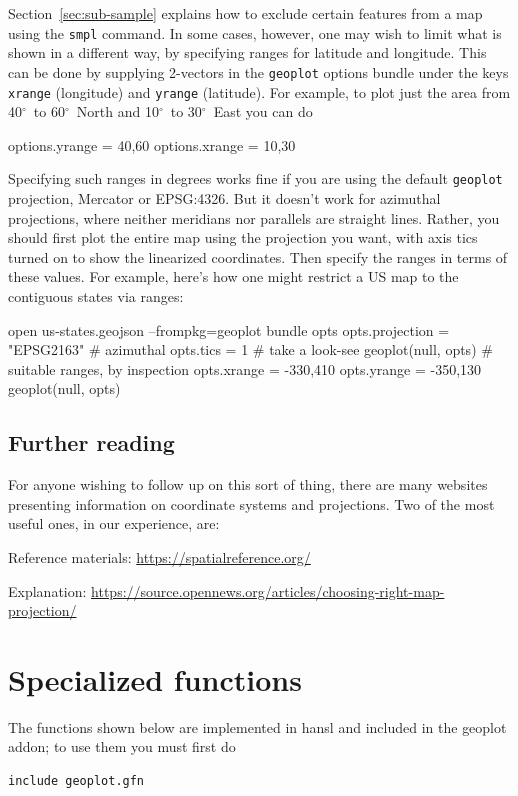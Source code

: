 \documentclass{article}
\renewcommand{\deg}{$^{\circ}$}
\newcommand{\myappendix}[1]{%
\addtocounter{appcount}{1}
\section{#1}}
\begin{document}
Section~\ref{sec:sub-sample} explains how to exclude certain features
from a map using the \texttt{smpl} command. In some cases, however,
one may wish to limit what is shown in a different way, by specifying
ranges for latitude and longitude. This can be done by supplying
2-vectors in the \texttt{geoplot} options bundle under the keys
\texttt{xrange} (longitude) and \texttt{yrange} (latitude). For
example, to plot just the area from 40\deg\ to 60\deg\ North and
10\deg\ to 30\deg\ East you can do
\begin{code}
options.yrange = {40,60}
options.xrange = {10,30}
\end{code}
Specifying such ranges in degrees works fine if you are using the
default \texttt{geoplot} projection, Mercator or \textsf{EPSG:4326}.
But it doesn't work for azimuthal projections, where neither meridians
nor parallels are straight lines. Rather, you should first plot the
entire map using the projection you want, with axis tics turned on to
show the linearized coordinates. Then specify the ranges in terms of
these values. For example, here's how one might restrict a US map to
the contiguous states via ranges:
\begin{code}
open us-states.geojson --frompkg=geoplot
bundle opts
opts.projection = "EPSG2163" # azimuthal
opts.tics = 1
# take a look-see
geoplot(null, opts)
# suitable ranges, by inspection
opts.xrange = {-330,410}
opts.yrange = {-350,130}
geoplot(null, opts)
\end{code}

\subsection*{Further reading}

For anyone wishing to follow up on this sort of thing, there are many
websites presenting information on coordinate systems and
projections. Two of the most useful ones, in our experience, are:

Reference materials: \url{https://spatialreference.org/}

Explanation:
\url{https://source.opennews.org/articles/choosing-right-map-projection/}

\clearpage
\myappendix{Specialized functions}
\label{app:special}

The functions shown below are implemented in hansl and included in the
\textsf{geoplot} addon; to use them you must first do
\begin{verbatim}
include geoplot.gfn
\end{verbatim}
\end{document}
